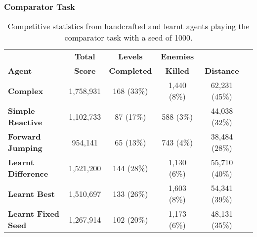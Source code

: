 \clearpage
\subsubsection{Comparator Task}

\begin{table}
  \begin{adjustwidth}{-0cm}{-0cm}
  \begin{center} \small
    \begin{tabular}{ | l | c | c | c | c | c |}
    \hline
    & \textbf{Total} & \textbf{Levels} & \textbf{Enemies} & \Tstrut \\
    \textbf{Agent} & \textbf{Score} & \textbf{Completed} & \textbf{Killed} & \textbf{Distance} \Bstrut \\ \thickhline
    \textbf{Complex} & 1,758,931 & 168 (33\%) & 1,440 (8\%) & 62,231 (45\%) \\ \hline
    \textbf{Simple Reactive} & 1,102,733 & 87 (17\%) & 588 (3\%) & 44,038 (32\%) \\ \hline
    \textbf{Forward Jumping} & 954,141 & 65 (13\%) & 743 (4\%) & 38,484 (28\%) \\ \thickhline
    \textbf{Learnt Difference} & 1,521,200 & 144 (28\%) & 1,130 (6\%) & 55,710 (40\%) \\ \hline
    \textbf{Learnt Best} & 1,510,697 & 133 (26\%) & 1,603 (8\%) & 54,341 (39\%) \\ \hline
    \textbf{Learnt Fixed Seed} & 1,267,914 & 102 (20\%) & 1,173 (6\%) & 48,131 (35\%) \\ \hline
    \end{tabular}
  \end{center}
  \end{adjustwidth}
  \caption{\small Competitive statistics from handcrafted and learnt agents playing the comparator task with a seed of 1000.}
  \label{tab:learnagentcomp}
\end{table}


